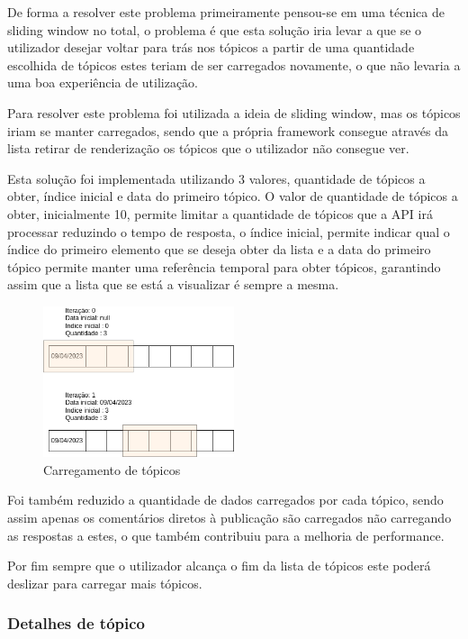 De forma a resolver este problema primeiramente pensou-se em uma técnica de sliding window no total, o problema é que esta solução iria levar a que se o utilizador desejar voltar para trás nos tópicos a partir de uma quantidade escolhida de tópicos estes teriam de ser carregados novamente, o que não levaria a uma boa experiência de utilização.

Para resolver este problema foi utilizada a ideia de sliding window, mas os tópicos iriam se manter carregados, sendo que a própria framework consegue através da lista retirar de renderização os tópicos que o utilizador não consegue ver. 

Esta solução foi implementada utilizando 3 valores, quantidade de tópicos a obter, índice inicial e data do primeiro tópico. O valor de quantidade de tópicos a obter, inicialmente 10, permite limitar a quantidade de tópicos que a API irá processar reduzindo o tempo de resposta, o índice inicial, permite indicar qual o índice do primeiro elemento que se deseja obter da lista e a data do primeiro tópico permite manter uma referência temporal para obter tópicos, garantindo assim que a lista que se está a visualizar é sempre a mesma.

\begin{figure}[htb]
  \centering
  \includegraphics[width=0.5\textwidth]{images/implementacao/frontend/forum/loading_topics/topics_loading.png}
  \caption{Carregamento de tópicos}
  \label{fig:73}
\end{figure}

Foi também reduzido a quantidade de dados carregados por cada tópico, sendo assim apenas os comentários diretos à publicação são carregados não carregando as respostas a estes, o que também contribuiu para a melhoria de performance.

Por fim sempre que o utilizador alcança o fim da lista de tópicos este poderá deslizar para carregar mais tópicos.

\newpage

\subsubsection{Detalhes de tópico}

